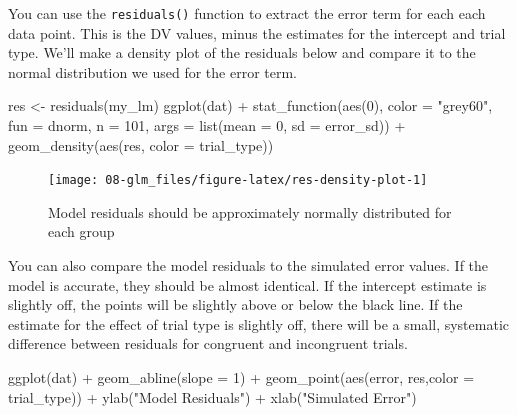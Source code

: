 \documentclass[
  oneside]{book}
\newenvironment{Shaded}{\begin{snugshade}}{\end{snugshade}}
\newcommand{\AttributeTok}[1]{\textcolor[rgb]{0.77,0.63,0.00}{#1}}
\newcommand{\DecValTok}[1]{\textcolor[rgb]{0.00,0.00,0.81}{#1}}
\newcommand{\FunctionTok}[1]{\textcolor[rgb]{0.00,0.00,0.00}{#1}}
\newcommand{\NormalTok}[1]{#1}
\newcommand{\OtherTok}[1]{\textcolor[rgb]{0.56,0.35,0.01}{#1}}
\newcommand{\SpecialCharTok}[1]{\textcolor[rgb]{0.00,0.00,0.00}{#1}}
\newcommand{\StringTok}[1]{\textcolor[rgb]{0.31,0.60,0.02}{#1}}
\begin{document}
You can use the \texttt{residuals()} function to extract the error term for each each data point. This is the DV values, minus the estimates for the intercept and trial type. We'll make a density plot of the residuals below and compare it to the normal distribution we used for the error term.

\begin{Shaded}
\begin{Highlighting}[]
\NormalTok{res }\OtherTok{\textless{}{-}} \FunctionTok{residuals}\NormalTok{(my\_lm)}
\FunctionTok{ggplot}\NormalTok{(dat) }\SpecialCharTok{+} 
  \FunctionTok{stat\_function}\NormalTok{(}\FunctionTok{aes}\NormalTok{(}\DecValTok{0}\NormalTok{), }\AttributeTok{color =} \StringTok{"grey60"}\NormalTok{,}
                \AttributeTok{fun =}\NormalTok{ dnorm, }\AttributeTok{n =} \DecValTok{101}\NormalTok{,}
                \AttributeTok{args =} \FunctionTok{list}\NormalTok{(}\AttributeTok{mean =} \DecValTok{0}\NormalTok{, }\AttributeTok{sd =}\NormalTok{ error\_sd)) }\SpecialCharTok{+}
  \FunctionTok{geom\_density}\NormalTok{(}\FunctionTok{aes}\NormalTok{(res, }\AttributeTok{color =}\NormalTok{ trial\_type))}
\end{Highlighting}
\end{Shaded}

\begin{figure}

{\centering \texttt{[image: 08-glm\_files/figure-latex/res-density-plot-1]} 

}

\caption{Model residuals should be approximately normally distributed for each group}\label{fig:res-density-plot}
\end{figure}

You can also compare the model residuals to the simulated error values. If the model is accurate, they should be almost identical. If the intercept estimate is slightly off, the points will be slightly above or below the black line. If the estimate for the effect of trial type is slightly off, there will be a small, systematic difference between residuals for congruent and incongruent trials.

\begin{Shaded}
\begin{Highlighting}[]
\FunctionTok{ggplot}\NormalTok{(dat) }\SpecialCharTok{+}
  \FunctionTok{geom\_abline}\NormalTok{(}\AttributeTok{slope =} \DecValTok{1}\NormalTok{) }\SpecialCharTok{+}
  \FunctionTok{geom\_point}\NormalTok{(}\FunctionTok{aes}\NormalTok{(error, res,}\AttributeTok{color =}\NormalTok{ trial\_type)) }\SpecialCharTok{+}
  \FunctionTok{ylab}\NormalTok{(}\StringTok{"Model Residuals"}\NormalTok{) }\SpecialCharTok{+}
  \FunctionTok{xlab}\NormalTok{(}\StringTok{"Simulated Error"}\NormalTok{)}
\end{Highlighting}
\end{Shaded}
\end{document}
